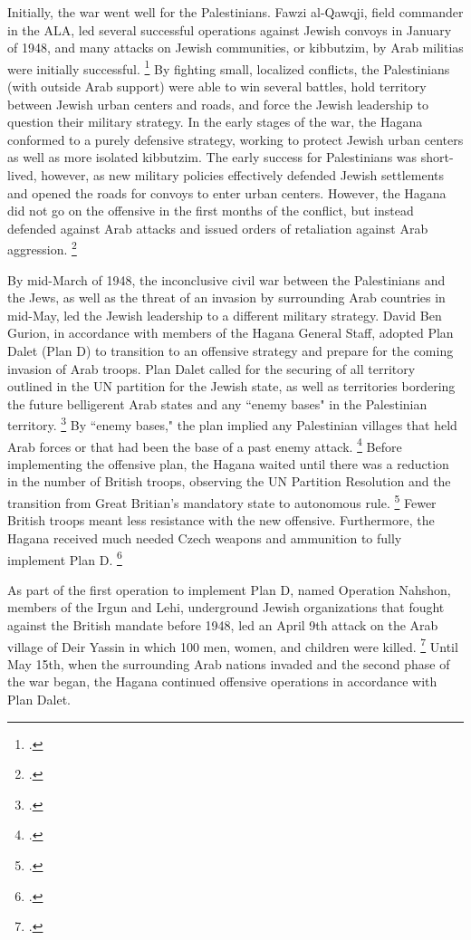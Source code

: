 \documentclass[12pt]{turabian-researchpaper}
\begin{document}
Initially, the war went well for the Palestinians.  Fawzi al-Qawqji, field commander in the ALA, led several successful operations against Jewish convoys in January of 1948, and many attacks on Jewish communities, or kibbutzim, by Arab militias were initially successful.
\footcite[][79]{pappe}
By fighting small, localized conflicts, the Palestinians (with outside Arab support) were able to win several battles, hold territory between Jewish urban centers and roads, and force the Jewish leadership to question their military strategy.  In the early stages of the war, the Hagana conformed to a purely defensive strategy, working to protect Jewish urban centers as well as more isolated kibbutzim.  The early success for Palestinians was short-lived, however, as new military policies effectively defended Jewish settlements and opened the roads for convoys to enter urban centers.  However, the Hagana did not go on the offensive in the first months of the conflict, but instead defended against Arab attacks and issued orders of retaliation against Arab aggression.
\footcite[][68]{tal}



By mid-March of 1948, the inconclusive civil war between the Palestinians and the Jews, as well as the threat of an invasion by surrounding Arab countries in mid-May, led the Jewish leadership to a different military strategy.  David Ben Gurion, in accordance with members of the Hagana General Staff, adopted Plan Dalet (Plan D) to transition to an offensive strategy and prepare for the coming invasion of Arab troops.  Plan Dalet called for the securing of all territory outlined in the UN partition for the Jewish state, as well as territories bordering the future belligerent Arab states and any ``enemy bases" in the Palestinian territory.
\footcite{khalidi}
By ``enemy bases," the plan implied any Palestinian villages that held Arab forces or that had been the base of a past enemy attack.
\footcite[][119]{morris}
Before implementing the offensive plan, the Hagana waited until there was a reduction in the number of British troops, observing the UN Partition Resolution and the transition from Great Britian's mandatory state to autonomous rule.
\footcite[][32]{herzog}
Fewer British troops meant less resistance with the new offensive.  Furthermore, the Hagana received much needed Czech weapons and ammunition to fully implement Plan D.
\footcite[][116]{morris}



As part of the first operation to implement Plan D, named Operation Nahshon, members of the Irgun and Lehi, underground Jewish organizations that fought against the British mandate before 1948, led an April 9th attack on the Arab village of Deir Yassin in which 100 men, women, and children were killed.
\footcite{nabka}
Until May 15th, when the surrounding Arab nations invaded and the second phase of the war began, the Hagana continued offensive operations in accordance with Plan Dalet.
\end{document}

